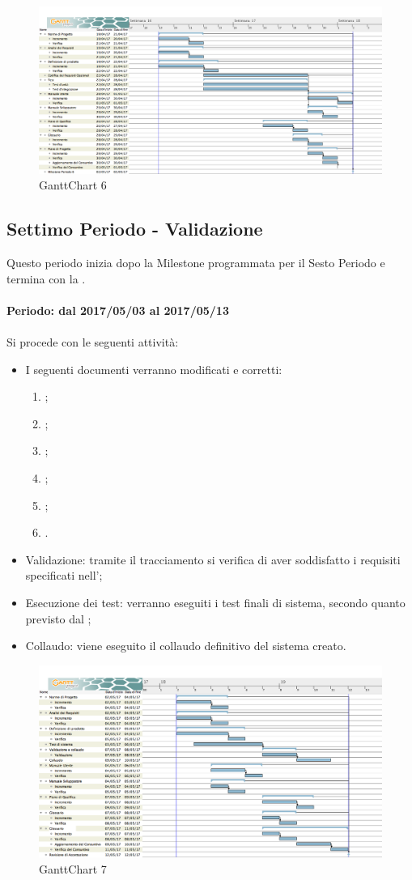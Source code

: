 \documentclass[../PianoDiProgetto_v4.0.0.tex]{subfiles}
\begin{document}
	\begin{figure}[!h]
		\centering
		\includegraphics[width=\textwidth]{Pianificazione/Immagini/GanttChart06.png}
		\caption{GanttChart 6}
	\end{figure}	
	
	\subsection{Settimo Periodo - Validazione}
	Questo periodo inizia dopo la Milestone programmata per il Sesto Periodo e termina con la \revisionediaccettazione.
	\\
	\\
	\textbf{Periodo: dal 2017/05/03 al 2017/05/13}
	\\
	\\
	Si procede con le seguenti attività:
	\begin{itemize}
		\item I seguenti documenti verranno modificati e corretti:
			\begin{enumerate}
				\item \normediprogetto;
				\item \analisideirequisiti;
				\item \pianodiqualifica;
				\item \pianodiprogetto;
				\item \manualeutente;
				\item \manualesviluppatore.
			\end{enumerate}
		\item Validazione: tramite il tracciamento si verifica di aver soddisfatto i requisiti specificati nell'\analisideirequisiti;
		\item Esecuzione dei test: verranno eseguiti i test finali di sistema, secondo quanto previsto dal \pianodiqualifica;
		\item Collaudo: viene eseguito il collaudo definitivo del sistema creato.
	\end{itemize}
	
	\begin{figure}[!h]
		\centering
		\includegraphics[width=\textwidth]{Pianificazione/Immagini/GanttChart07.png}
		\caption{GanttChart 7}
	\end{figure}	
	
\end{document}
